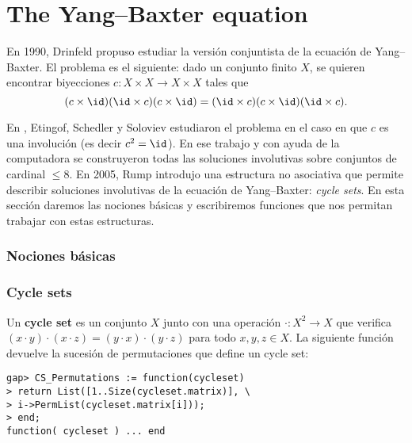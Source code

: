 \chapter{The Yang--Baxter equation}

En 1990, Drinfeld \cite{MR1183474} propuso estudiar la versión conjuntista de
la ecuación de Yang--Baxter. El problema es el siguiente: dado un conjunto
finito $X$, se quieren encontrar biyecciones $c\colon X\times X\to X\times X$
tales que
\[
    (c\times\id)(\id\times c)(c\times\id)=(\id\times c)(c\times\id)(\id\times c).
\]

En \cite{MR1722951}, Etingof, Schedler y Soloviev estudiaron el problema en el
caso en que $c$ es una involución (es decir $c^2=\id$). En ese trabajo y con
ayuda de la computadora se construyeron todas las soluciones involutivas sobre
conjuntos de cardinal $\leq 8$. En 2005, Rump \cite{MR2132760} introdujo una
estructura no asociativa que permite describir soluciones involutivas de la
ecuación de Yang--Baxter: \emph{cycle sets}. En esta sección daremos las
nociones básicas y escribiremos funciones que nos permitan trabajar con estas
estructuras.

\subsection{Nociones básicas}

\begin{block}
	
\end{block}

\subsection{Cycle sets}

\begin{block}
Un \textbf{cycle set} es un conjunto $X$ junto con una operación
$\cdot\colon X^2\to X$ que verifica $(x\cdot y)\cdot (x\cdot z)=(y\cdot
x)\cdot (y\cdot z)$ para todo $x,y,z\in X$. La siguiente función 
devuelve la sucesión de permutaciones que define un cycle set:
\begin{lstlisting}
gap> CS_Permutations := function(cycleset)
> return List([1..Size(cycleset.matrix)], \
> i->PermList(cycleset.matrix[i]));
> end;
function( cycleset ) ... end
\end{lstlisting}
\end{block}

